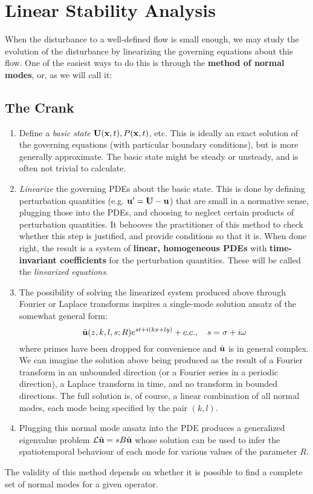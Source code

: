 \section{Linear Stability Analysis}
When the disturbance to a well-defined flow is small enough, we may study the evolution of the disturbance by linearizing the governing equations about this flow. One of the easiest ways to do this is through the \textbf{method of normal modes}, or, as we will call it: 

\subsection{The Crank\texttrademark}
\begin{enumerate}
    \item Define a \emph{basic state} ${\textbf{U}}({\textbf{x}}, t), P({\textbf{x}}, t)$, etc. This is ideally an exact solution of the governing equations (with particular boundary conditions), but is more generally approximate. The basic state might be steady or unsteady, and is often not trivial to calculate. 
    
    \item \emph{Linearize} the governing PDEs about the basic state. This is done by defining perturbation quantities (e.g. ${\textbf{u}}' = {\textbf{U}} - {\textbf{u}}$) that are small in a normative sense, plugging those into the PDEs, and choosing to neglect certain products of perturbation quantities. It behooves the practitioner of this method to check whether this step is justified, and provide conditions so that it is. When done right, the result is a system of \textbf{linear, homogeneous PDEs} with \textbf{time-invariant coefficients} for the perturbation quantities. These will be called the \emph{linearized equations}.
    
    \item The possibility of solving the linearized system produced above through Fourier or Laplace transforms inspires a single-mode solution ansatz of the somewhat general form: \[\hat{{\textbf{u}}}(z, k, l, s; R) e^{st + i(kx + ly)} + c.c., \quad s = \sigma + i\omega\] where primes have been dropped for convenience and $\hat{{\textbf{u}}}$ is in general complex. We can imagine the solution above being produced as the result of a Fourier transform in an unbounded direction (or a Fourier series in a periodic direction), a Laplace transform in time, and no transform in bounded directions. The full solution is, of course, a linear combination of all normal modes, each mode being specified by the pair $(k, l)$. 
    
    \item Plugging this normal mode ansatz into the PDE produces a generalized eigenvalue problem $\mathcal{L}\hat{{\textbf{u}}} = sB\hat{{\textbf{u}}}$ whose solution can be used to infer the spatiotemporal behaviour of each mode for various values of the parameter $R$.
\end{enumerate}
The validity of this method depends on whether it is possible to find a complete set of normal modes for a given operator.

